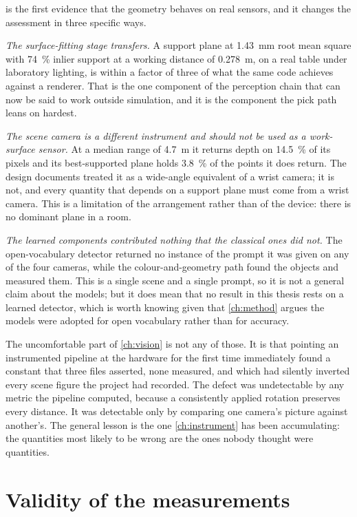  is the first evidence that the geometry behaves on real
sensors, and it changes the assessment in three specific ways.

\emph{The surface-fitting stage transfers.} A support plane at
\SI{1.43}{\milli\metre} root mean square with \SI{74}{\percent} inlier support
at a working distance of \SI{0.278}{\metre}, on a real table under laboratory
lighting, is within a factor of three of what the same code achieves against a
renderer. That is the one component of the perception chain that can now be
said to work outside simulation, and it is the component the pick path leans
on hardest.

\emph{The scene camera is a different instrument and should not be used as a
work-surface sensor.} At a median range of \SI{4.7}{\metre} it returns depth
on \SI{14.5}{\percent} of its pixels and its best-supported plane holds
\SI{3.8}{\percent} of the points it does return. The design documents treated
it as a wide-angle equivalent of a wrist camera; it is not, and every quantity
that depends on a support plane must come from a wrist camera. This is a
limitation of the arrangement rather than of the device: there is no dominant
plane in a room.

\emph{The learned components contributed nothing that the classical ones did
not.} The open-vocabulary detector returned no instance of the prompt it was
given on any of the four cameras, while the colour-and-geometry path found the
objects and measured them. This is a single scene and a single prompt, so it
is not a general claim about the models; but it does mean that no result in
this thesis rests on a learned detector, which is worth knowing given that
\cref{ch:method} argues the models were adopted for open vocabulary rather
than for accuracy.

The uncomfortable part of \cref{ch:vision} is not any of those. It is that
pointing an instrumented pipeline at the hardware for the first time
immediately found a constant that three files asserted, none measured, and
which had silently inverted every scene figure the project had recorded. The
defect was undetectable by any metric the pipeline computed, because a
consistently applied rotation preserves every distance. It was detectable only
by comparing one camera's picture against another's. The general lesson is the
one \cref{ch:instrument} has been accumulating: the quantities most likely to
be wrong are the ones nobody thought were quantities.

\section{Validity of the measurements}
\label{sec:validity}

